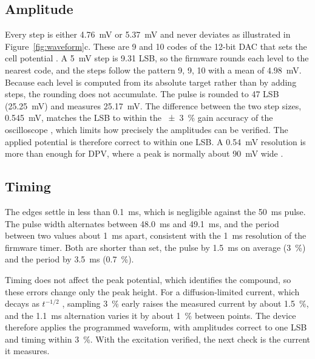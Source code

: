 \subsection{Amplitude}
\label{sec:waveform_amplitude}

Every step is either \SI{4.76}{\milli\volt} or \SI{5.37}{\milli\volt} and never
deviates as illustrated in Figure~\ref{fig:waveform}c. These are 9 and
10 codes of the 12-bit DAC that sets the cell potential \cite{ad5941_ds}. A \SI{5}{\milli\volt} step is 9.31
LSB, so the firmware rounds each level to the nearest code, and the steps follow
the pattern 9, 9, 10 with a mean of \SI{4.98}{\milli\volt}. Because each level
is computed from its absolute target rather than by adding steps, the rounding
does not accumulate. The pulse is rounded to 47 LSB (\SI{25.25}{\milli\volt})
and measures \SI{25.17}{\milli\volt}. The difference between the two step
sizes, \SI{0.545}{\milli\volt}, matches the LSB to within the
\SI{\pm 3}{\percent} gain accuracy of the oscilloscope \cite{siglent_sds1000xe},
which limits how precisely the amplitudes can be verified. The applied
potential is therefore correct to within one LSB. A \SI{0.54}{\milli\volt} resolution is more than enough for DPV, where a peak is normally
about \SI{90}{\milli\volt} wide \cite{bard2001}.

\subsection{Timing}
\label{sec:waveform_timing}

The edges settle in less than \SI{0.1}{\milli\second}, which is negligible
against the \SI{50}{\milli\second} pulse. The pulse width alternates between
\SI{48.0}{\milli\second} and \SI{49.1}{\milli\second}, and the period between
two values about \SI{1}{\milli\second} apart, consistent with the
\SI{1}{\milli\second} resolution of the firmware timer. Both are shorter than
set, the pulse by \SI{1.5}{\milli\second} on average
(\SI{3}{\percent}) and the period by \SI{3.5}{\milli\second}
(\SI{0.7}{\percent}).

Timing does not affect the peak potential, which identifies the compound, so
these errors change only the peak height. For a diffusion-limited current,
which decays as $t^{-1/2}$ \cite{bard2001}, sampling \SI{3}{\percent} early
raises the measured current by about \SI{1.5}{\percent}, and the
\SI{1.1}{\milli\second} alternation varies it by about \SI{1}{\percent}
between points. The device therefore applies the programmed waveform, with
amplitudes correct to one LSB and timing within \SI{3}{\percent}. With
the excitation verified, the next check is the current it measures.

